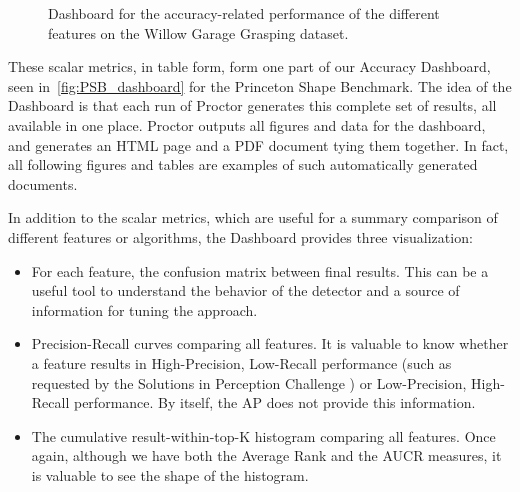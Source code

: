 \begin{figure}[thpb]
   \hfill
  \caption{Dashboard for the accuracy-related performance of the different features on the Willow Garage Grasping dataset.}
  \label{fig:WGDB_dashboard}
\end{figure}

These scalar metrics, in table form, form one part of our Accuracy Dashboard, seen in~\autoref{fig:PSB_dashboard} for the Princeton Shape Benchmark.
The idea of the Dashboard is that each run of Proctor generates this complete set of results, all available in one place.
Proctor outputs all figures and data for the dashboard, and generates an HTML page and a PDF document tying them together.
In fact, all following figures and tables are examples of such
automatically generated documents.

In addition to the scalar metrics, which are useful for a summary comparison of different features or algorithms, the Dashboard provides three visualization:
\begin{itemize}
  \item For each feature, the confusion matrix between final results. This can be a useful tool to understand the behavior of the detector and a source of information for tuning the approach.
  \item Precision-Recall curves comparing all features. It is valuable to know whether a feature results in High-Precision, Low-Recall performance (such as requested by the Solutions in Perception Challenge \cite{SIPC2011}) or Low-Precision, High-Recall performance. By itself, the AP does not provide this information.
  \item The cumulative result-within-top-K histogram comparing all features. Once again, although we have both the Average Rank and the AUCR measures, it is valuable to see the shape of the histogram.
\end{itemize}

